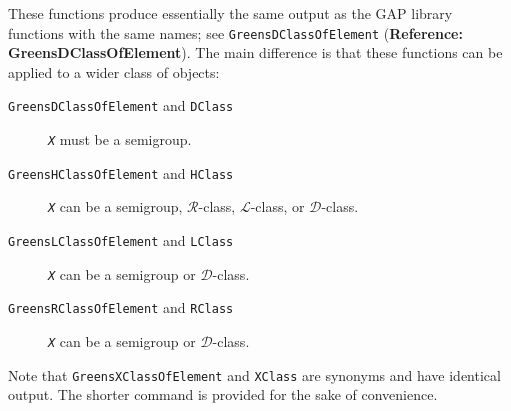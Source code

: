\documentclass[a4paper,11pt]{report}
\begin{document}
{{{ These functions produce essentially the same output as the \textsf{GAP} library functions with the same names; see \texttt{GreensDClassOfElement} (\textbf{Reference: GreensDClassOfElement}). The main difference is that these functions can be applied to a wider class
of objects: 
\begin{description}
\item[{\texttt{GreensDClassOfElement} and \texttt{DClass}}]  \mbox{\texttt{\mdseries\slshape X}} must be a semigroup. 
\item[{\texttt{GreensHClassOfElement} and \texttt{HClass}}]  \mbox{\texttt{\mdseries\slshape X}} can be a semigroup, $\mathcal{R}$-class, $\mathcal{L}$-class, or $\mathcal{D}$-class. 
\item[{\texttt{GreensLClassOfElement} and \texttt{LClass}}]  \mbox{\texttt{\mdseries\slshape X}} can be a semigroup or $\mathcal{D}$-class. 
\item[{\texttt{GreensRClassOfElement} and \texttt{RClass}}]  \mbox{\texttt{\mdseries\slshape X}} can be a semigroup or $\mathcal{D}$-class. 
\end{description}
 Note that \texttt{GreensXClassOfElement} and \texttt{XClass} are synonyms and have identical output. The shorter command is provided for
the sake of convenience.

 }

 
}}
\end{document}
